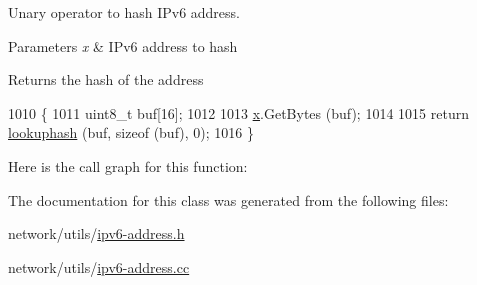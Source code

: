 Unary operator to hash I\+Pv6 address. 


\begin{DoxyParams}{Parameters}
{\em x} & I\+Pv6 address to hash \\
\hline
\end{DoxyParams}
\begin{DoxyReturn}{Returns}
the hash of the address 
\end{DoxyReturn}

\begin{DoxyCode}
1010 \{
1011   uint8\_t buf[16];
1012 
1013   \hyperlink{lte__link__budget__x2__handover__measures_8m_a9336ebf25087d91c818ee6e9ec29f8c1}{x}.GetBytes (buf);
1014 
1015   \textcolor{keywordflow}{return} \hyperlink{namespacens3_a9dc35ee6c77a41cca2403ad5907b1207}{lookuphash} (buf, \textcolor{keyword}{sizeof} (buf), 0);
1016 \}
\end{DoxyCode}


Here is the call graph for this function\+:




The documentation for this class was generated from the following files\+:\begin{DoxyCompactItemize}
\item 
network/utils/\hyperlink{ipv6-address_8h}{ipv6-\/address.\+h}\item 
network/utils/\hyperlink{ipv6-address_8cc}{ipv6-\/address.\+cc}\end{DoxyCompactItemize}
